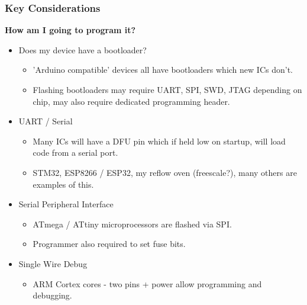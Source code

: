 \documentclass[t]{beamer}
\begin{document}
\begin{frame}
\frametitle{Key Considerations}
\large{\textbf{How am I going to program it?}}
\vspace{1mm}
\begin{itemize}
	\item Does my device have a bootloader?
	\begin{itemize}
		\item 'Arduino compatible' devices all have bootloaders which new ICs don't. 
		\item Flashing bootloaders may require UART, SPI, SWD, JTAG depending on chip, may also require dedicated programming header.  
	\end{itemize} 
	\item UART / Serial
	\begin{itemize}
		\item Many ICs will have a DFU pin which if held low on startup, will load code from a serial port. 
		\item STM32, ESP8266 / ESP32, my reflow oven (freescale?), many others are examples of this.
	\end{itemize}
	\item Serial  Peripheral Interface
	\begin{itemize}
		\item ATmega / ATtiny microprocessors are flashed via SPI.
		\item Programmer also required to set fuse bits.   
	\end{itemize}
	\item Single Wire Debug
	\begin{itemize}
		\item ARM Cortex cores - two pins + power allow programming and debugging. 
	\end{itemize}
\end{itemize}
\end{frame}

\end{document}

